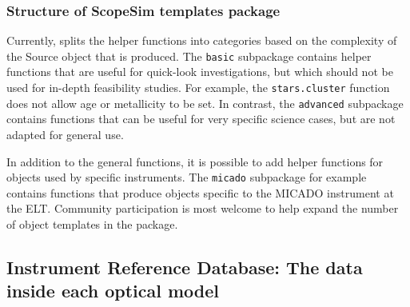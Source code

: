\subsubsection{Structure of ScopeSim templates package}
\label{structure-of-scopesim-templates-package}

Currently, \ScopeSimtemplates{} splits the helper functions into
categories based on the complexity of the Source object that is
produced.  The \lstinline{basic} subpackage contains helper functions
that are useful for quick-look investigations, but which should not be
used for in-depth feasibility studies.  For example, the
\lstinline{stars.cluster} function does not allow age or metallicity
to be set.  In contrast, the \lstinline{advanced} subpackage contains
functions that can be useful for very specific science cases, but are
not adapted for general use.

In addition to the general functions, it is possible to add helper
functions for objects used by specific instruments.  The
\lstinline{micado} subpackage for example contains functions that
produce objects specific to the MICADO instrument at the ELT.
Community participation is most welcome to help expand the number of
object templates in the \ScopeSimtemplates{} package.


\subsection{Instrument Reference Database: The data inside each optical model}
\label{instrument-reference-database-the-optical-model-data}

